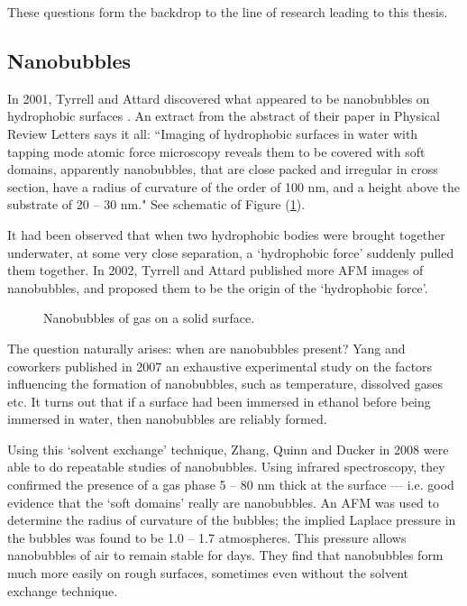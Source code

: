\documentclass[12pt, a4paper, twoside, openright]{book}
\begin{document}
These questions form the backdrop to the line of research leading to this thesis.

\subsection{Nanobubbles}

In 2001, Tyrrell and Attard discovered what appeared to be nanobubbles on hydrophobic surfaces \cite{TyrrellAttard2001}.   An extract from the abstract of their paper in Physical Review Letters says it all: ``Imaging of hydrophobic surfaces in water with tapping mode atomic force microscopy reveals them to be covered with soft domains, apparently nanobubbles, that are close packed and irregular in cross section, have a radius of curvature of the order of 100 nm, and a height above the substrate of 20 -- 30 nm."  
See schematic of Figure (\ref{nanobubbles}).

It had been observed that when two hydrophobic bodies were brought together underwater, at some very close separation, a `hydrophobic force' suddenly pulled them together.  In 2002, Tyrrell and Attard published \cite{TyrrellAttard2002} more AFM images of nanobubbles, and proposed them to be the origin of the `hydrophobic force'.

\begin{figure}[ht]
\centering
{}
\caption{Nanobubbles of gas on a solid surface.}\label{nanobubbles}
\end{figure}

The question naturally arises: when are nanobubbles present?  Yang and coworkers published in 2007 \cite{Yang2007} an exhaustive experimental study on the factors influencing the formation of nanobubbles, such as temperature, dissolved gases etc.  It turns out that if a surface had been immersed in ethanol before being immersed in water, then nanobubbles are reliably formed.  

Using this `solvent exchange' technique, Zhang, Quinn and Ducker in 2008 \cite{ZhangQuinnDucker2007} were able to do repeatable studies of nanobubbles.  Using infrared spectroscopy, they confirmed the presence of a gas phase 5 -- 80 nm thick at the surface --- i.e. good evidence that the `soft domains' really are nanobubbles.
An AFM was used to determine the radius of curvature of the bubbles; the implied Laplace pressure in the bubbles was found to be 1.0 -- 1.7 atmospheres.  This pressure allows nanobubbles of air to remain stable for days.  They find that nanobubbles form much more easily on rough surfaces, sometimes even without the solvent exchange technique.
\end{document}
